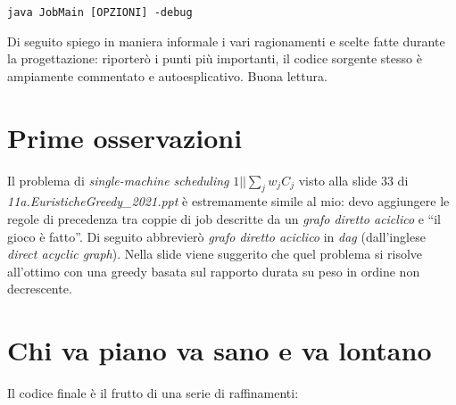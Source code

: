 \documentclass[12pt, letterpaper]{article}
\begin{document}
\begin{verbatim}
java JobMain [OPZIONI] -debug
\end{verbatim}

Di seguito spiego in maniera informale i vari ragionamenti e scelte fatte durante la progettazione: riporterò i punti più importanti, il codice sorgente stesso è ampiamente commentato e autoesplicativo. Buona lettura.

\section{Prime osservazioni}

Il problema di \textit{single-machine scheduling} $1||\sum_j w_j C_j$ visto alla slide 33 di \textit{11a.EuristicheGreedy\_2021.ppt} è estremamente simile al mio: devo aggiungere le regole di precedenza tra coppie di job descritte da un \textit{grafo diretto aciclico} e ``il gioco è fatto''.
Di seguito abbrevierò \textit{grafo diretto aciclico} in \textit{dag} (dall'inglese \textit{direct acyclic graph}).
Nella slide viene suggerito che quel problema si risolve all'ottimo con una greedy basata sul rapporto durata su peso in ordine non decrescente.

\section{Chi va piano va sano e va lontano}

Il codice finale è il frutto di una serie di raffinamenti:
\end{document}
